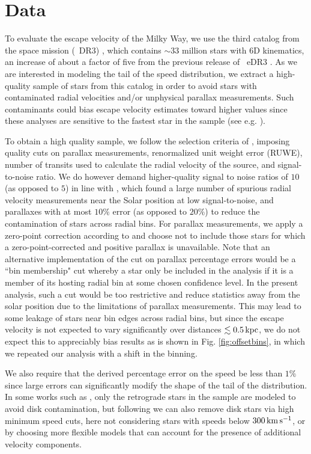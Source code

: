 \section{Data} \label{sec:data}

To evaluate the escape velocity of the Milky Way, we use the third catalog from the \Gaia space mission (\Gaia~DR3) \citep{gaia:2016,gaiaDR3}, which contains $\sim 33$ million stars with 6D kinematics, an increase of about a factor of five from the previous release of \Gaia~eDR3 \citep{GaiaeDR3}. 
As we are interested in modeling the tail of the speed distribution, we extract a high-quality sample of stars from this catalog in order to avoid stars with contaminated radial velocities and/or unphysical parallax measurements. Such contaminants could bias escape velocity estimates toward higher values since these analyses are sensitive to the fastest star in the sample (see e.g. \cite{Koppelman2021}). 

To obtain a high quality sample, we follow the selection criteria of \cite{marchetti}, imposing quality cuts on parallax measurements, renormalized unit weight error (RUWE), number of transits used to calculate the radial velocity of the source, and signal-to-noise ratio. We do however demand  higher-quality signal to noise ratios of $10$ (as opposed to $5$) in line with \cite{gaiaRVs}, which found a large number of spurious radial velocity measurements near the Solar position at low signal-to-noise, and parallaxes with at most $10\%$ error (as opposed to $20\%$) to reduce the contamination of stars across radial bins. 
For parallax measurements, we apply a zero-point correction according to \cite{zpcorr} and choose not to include those stars for which a zero-point-corrected and positive parallax is unavailable. Note that an alternative implementation of the cut on parallax percentage errors would be a ``bin membership" cut whereby a star only be included in the analysis if it is a member of its hosting radial bin at some chosen confidence level. In the present analysis, such a cut would be too restrictive and reduce statistics away from the solar position due to the limitations of parallax measurements. This may lead to some leakage of stars near bin edges across radial bins, but since the escape velocity is not expected to vary significantly over distances $\lesssim 0.5\,\rm{kpc}$, we do not expect this to appreciably bias results as is shown in Fig. \ref{fig:offsetbins}, in which we repeated our analysis with a shift in the binning. 

We also require that the derived percentage error on the speed be less than $1\%$ since large errors can significantly modify the shape of the tail of the distribution. In some works such as \cite{Piffl2014, Monari2018}, only the retrograde stars in the sample are modeled to avoid disk contamination, but following \cite{Necib2022} we can also remove disk stars via high minimum speed cuts, here not considering stars with speeds below $300\,\rm{km\,s^{-1}}$, or by choosing more flexible models that can account for the presence of additional velocity components.

